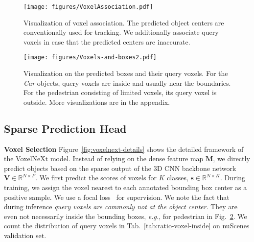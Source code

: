\documentclass[10pt,twocolumn,letterpaper]{article}
\begin{document}
\begin{figure}[t]
\begin{center}
   \texttt{[image: figures/VoxelAssociation.pdf]}
   \caption{Visualization of voxel association. The predicted object centers are conventionally used for tracking. We additionally associate query voxels in case that the predicted centers are inaccurate.}
   \label{fig:voxel-association}
\end{center}
\end{figure}
\begin{figure}[t]
\begin{center}
   \texttt{[image: figures/Voxels-and-boxes2.pdf]}
   \caption{Visualization on the predicted boxes and their query voxels. For the {\em Car} objects, query voxels are inside and usually near the boundaries. For the pedestrian consisting of limited voxels, its query voxel is outside. More visualizations are in the appendix.}
   \label{fig:voxels-and-points}
\end{center}
\end{figure}



\subsection{Sparse Prediction Head}
\label{sec:sparse-prediction-head}

\noindent
\textbf{Voxel Selection}
Figure~\ref{fig:voxelnext-details} shows the detailed framework of the VoxelNeXt model. Instead of relying on the dense feature map $\mathbf{M}$, we directly predict objects based on the sparse output of the 3D CNN backbone network $\mathbf{V}\in \mathbb{R}^{N\times F}$. We first predict the scores of voxels for $K$ classes, $\mathbf{s}\in \mathbb{R}^{N\times K}$. During training, we assign the voxel nearest to each annotated bounding box center as a positive sample. We use a focal loss~\cite{focalloss} for supervision. 
We note the fact that during inference {\em query voxels are commonly not at the object center}.
They are even not necessarily inside the bounding boxes, {\em e.g.}, for pedestrian in Fig.~\ref{fig:voxels-and-points}. We count the distribution of query voxels in Tab.~\ref{tab:ratio-voxel-inside} on nuScenes validation set. 
\end{document}
